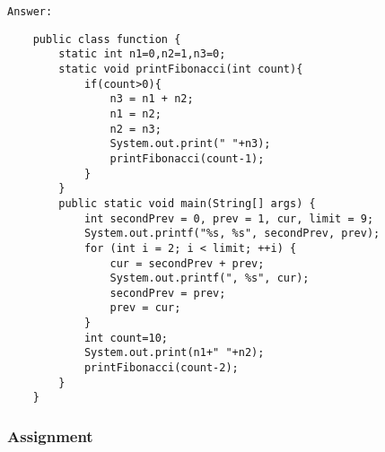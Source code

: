 \documentclass[12pt,titlepage]{article}
\begin{document}
\texttt{Answer: }

\begin{verbatim}
    public class function {
        static int n1=0,n2=1,n3=0; 
        static void printFibonacci(int count){    
            if(count>0){    
                n3 = n1 + n2;    
                n1 = n2;    
                n2 = n3;    
                System.out.print(" "+n3);   
                printFibonacci(count-1);    
            }    
        }
        public static void main(String[] args) {
            int secondPrev = 0, prev = 1, cur, limit = 9;
            System.out.printf("%s, %s", secondPrev, prev);
            for (int i = 2; i < limit; ++i) {
                cur = secondPrev + prev;
                System.out.printf(", %s", cur);
                secondPrev = prev;
                prev = cur;
            }
            int count=10;    
            System.out.print(n1+" "+n2);    
            printFibonacci(count-2);
        }
    }
\end{verbatim}

\subsubsection{Assignment}
\end{document}
